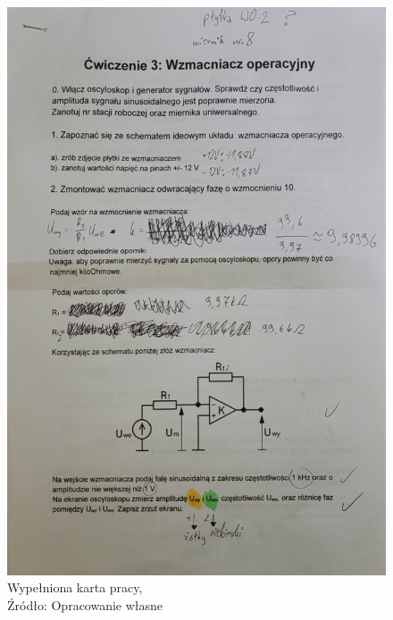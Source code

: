 \documentclass{article}
\begin{document}
    \begin{figure}[!ht]
      \begin{minipage}{.5\textwidth}
          \centering
          \includegraphics[scale=0.2]{grafiki/zdj1.jpg}
          \caption{Wypełniona karta pracy,
          \\Źródło: Opracowanie własne}
      \end{minipage}
      \begin{minipage}{.5\textwidth}
          \centering

\end{minipage}
\end{figure}
\end{document}

